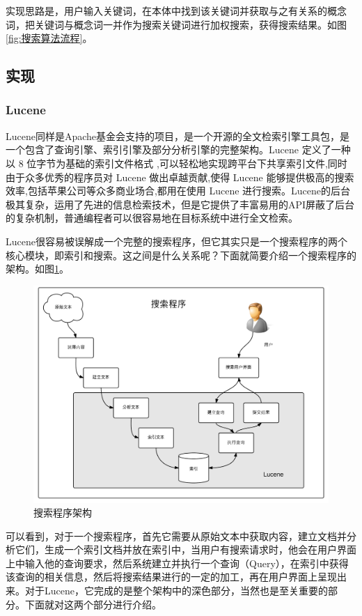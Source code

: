 \documentclass[12pt,a4paper]{article}
\begin{document}
	实现思路是，用户输入关键词，在本体中找到该关键词并获取与之有关系的概念词，把关键词与概念词一并作为搜索关键词进行加权搜索，获得搜索结果。如图\ref{fig:搜索算法流程}。
	
	\subsection{实现}
		\subsubsection{Lucene}
	Lucene同样是Apache基金会支持的项目，是一个开源的全文检索引擎工具包，是一个包含了查询引擎、索引引擎及部分分析引擎的完整架构。Lucene 定义了一种以 8 位字节为基础的索引文件格式 ,可以轻松地实现跨平台下共享索引文件,同时由于众多优秀的程序员对 Lucene 做出卓越贡献,使得 Lucene 能够提供极高的搜索效率,包括苹果公司等众多商业场合,都用在使用 Lucene 进行搜索。Lucene的后台极其复杂，运用了先进的信息检索技术，但是它提供了丰富易用的API屏蔽了后台的复杂机制，普通编程者可以很容易地在目标系统中进行全文检索。
	
	Lucene很容易被误解成一个完整的搜索程序，但它其实只是一个搜索程序的两个核心模块，即索引和搜索。这之间是什么关系呢？下面就简要介绍一个搜索程序的架构。如图\ref{fig:搜索程序架构}。
	
	\begin{figure}[htbp] 
	\centering\includegraphics[width=5in]{fig/SearchEngineFrame.png} 
	\caption{搜索程序架构}\label{fig:搜索程序架构} 
	\end{figure} 
	
	可以看到，对于一个搜索程序，首先它需要从原始文本中获取内容，建立文档并分析它们，生成一个索引文档并放在索引中，当用户有搜索请求时，他会在用户界面上中输入他的查询要求，然后系统建立并执行一个查询（Query），在索引中获得该查询的相关信息，然后将搜索结果进行的一定的加工，再在用户界面上呈现出来。对于Lucene，它完成的是整个架构中的深色部分，当然也是至关重要的部分。下面就对这两个部分进行介绍。	
	
\end{document}

